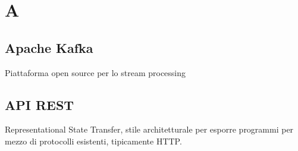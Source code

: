 \section*{A}
\subsection*{Apache Kafka}
Piattaforma open source per lo stream processing

\subsection*{API REST}
Representational State Transfer, stile architetturale per esporre programmi per mezzo di protocolli esistenti, tipicamente HTTP.

